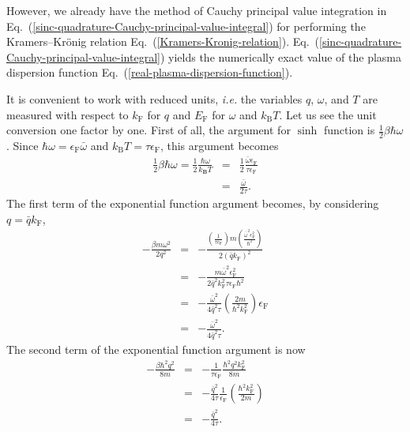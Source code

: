 \documentclass[aps,showkeys,noshowpacs,superscriptaddress,pre,preprint]{revtex4-2}
\begin{document}
However, we already have the method of Cauchy principal value integration 
in Eq.~(\ref{sinc-quadrature-Cauchy-principal-value-integral})
for performing the Kramers--Kr\"onig relation Eq.~(\ref{Kramers-Kronig-relation}).
Eq.~(\ref{sinc-quadrature-Cauchy-principal-value-integral}) yields 
the numerically exact value of the plasma dispersion function Eq.~(\ref{real-plasma-dispersion-function}).

It is convenient to work with reduced units,
\textit{i.e.} the variables $q$, $\omega$, and $T$ are measured with respect to 
$k_\mathrm{F}$ for $q$ and $E_\mathrm{F}$ for $\omega$ and $k_\mathrm{B}T$.
Let us see the unit conversion one factor by one.
First of all, the argument for $\sinh$ function is $\frac{1}{2} \beta \hbar \omega$.
Since $\hbar \omega = \epsilon_\mathrm{F} \bar{\omega}$
and $k_\mathrm{B} T = \tau \epsilon_\mathrm{F}$,
this argument becomes
\begin{eqnarray*}
\frac{1}{2} \beta \hbar \omega 
= \frac{1}{2} \frac{\hbar \omega}{k_\mathbf{B} T} 
&=& \frac{1}{2} \frac{\bar{\omega} \epsilon_\mathrm{F}}{\tau \epsilon_\mathrm{F}}
\\ 
&=& \frac{\bar{\omega}}{2 \tau} .
\end{eqnarray*}
The first term of the exponential function argument becomes,
by considering $q = \bar{q} k_\mathrm{F}$,
\begin{eqnarray*}
- \frac{\beta m \omega^2}{2 q^2} 
&=& - \frac{\left( \frac{1}{\tau \epsilon_\mathrm{F}} \right)  m \left( \frac{\bar{\omega}^2 \epsilon^2_\mathrm{F}}{\hbar^2} \right)}
{ 2 \left( \bar{q} k_\mathrm{F} \right)^2 } 
\\
&=& - \frac{ m \bar{\omega}^2 \epsilon^2_\mathrm{F}}{2 \bar{q}^2 k_\mathrm{F}^2 \tau \epsilon_\mathrm{F} \hbar^2}
\\
&=& - \frac{\bar{\omega}^2}{4 \bar{q}^2 \tau} \left( \frac{2 m}{\hbar^2  k_\mathrm{F}^2} \right) \epsilon_\mathrm{F}
\\
&=& - \frac{\bar{\omega}^2}{4 \bar{q}^2 \tau} .
\end{eqnarray*}
The second term of the exponential function argument is now
\begin{eqnarray*}
- \frac{\beta \hbar^2 q^2}{8 m}
&=& - \frac{1}{\tau \epsilon_\mathrm{F}} \frac{\hbar^2 q^2 k_\mathrm{F}^2}{8 m}
\\
&=& - \frac{\bar{q}^2}{4 \tau} \frac{1}{\epsilon_\mathrm{F}} \left( \frac{\hbar^2 k_\mathrm{F}^2}{2m} \right)
\\
&=& - \frac{\bar{q}^2}{4 \tau} .
\end{eqnarray*}
\end{document}
